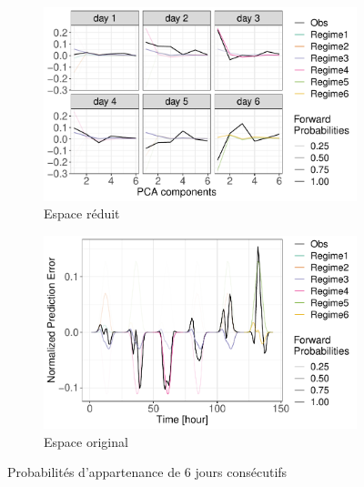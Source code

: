 \documentclass[12pt]{report}
\begin{document}
\begin{figure}[h]
	\begin{center}
		
		\begin{subfigure}[b]{0.85\linewidth}
			\centering
			\includegraphics[width = 0.95 \linewidth]{Images/PV/HMM/HMM_ForwardProb_ACP_TrainDataset.pdf}
			\caption{Espace réduit}
			\label{fig:PV_HMM_ForwardReduct}
		\end{subfigure}%
		
		\begin{subfigure}[b]{0.85\linewidth}
			\centering
			\includegraphics[width = 0.95 \linewidth]{Images/PV/HMM/HMM_ForwardProb_Reconstructed_TrainDataset.pdf}
			\caption{Espace original}
			\label{fig:PV_HMM_ForwardOrig}
		\end{subfigure}
	\end{center}
	
	\caption{Probabilités d'appartenance de 6 jours consécutifs}
	\label{fig:PV_HMM_Forward} 
\end{figure}
\end{document}
